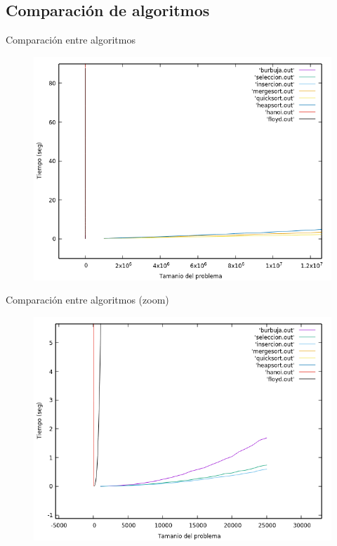 \documentclass{beamer}
\begin{document}
\subsection{Comparación de algoritmos}
\begin{frame}[fragile]{Comparación entre algoritmos}
\begin{figure}[H]
\centering
\includegraphics[scale=0.5]{empirica_todos.png}
\end{figure}
\end{frame}


\begin{frame}[fragile]{Comparación entre algoritmos (zoom)}
\begin{figure}[H]
\centering
\includegraphics[scale=0.5]{empirica_todos_zoom.png}
\end{figure}
\end{frame}
\end{document}

